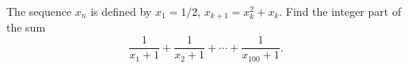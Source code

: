 The sequence $x_n$ is defined by $x_1 = 1/2$, $x_{k+1} = x_k^2 + x_k$. Find the integer part of the sum
\[ \frac{1}{x_1 + 1} + \frac{1}{x_2 + 1} + \cdots + \frac{1}{x_{100} + 1}. \]

